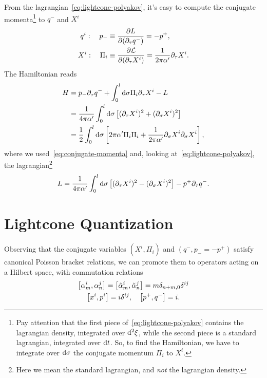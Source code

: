 From the lagrangian~\eqref{eq:lightcone-polyakov}, it's easy to compute the conjugate momenta\footnote{Pay attention that the first piece of~\eqref{eq:lightcone-polyakov} contains the lagrangian density, integrated over $\mathop{}\!\mathrm{d}^2 \xi$, while the second piece is a standard lagrangian, integrated over $\mathop{}\!\mathrm{d} t$. So, to find the Hamiltonian, we have to integrate over $\mathop{}\!\mathrm{d} \sigma$ the conjugate momentum $\Pi_i$ to $X^i$.} to $q^-$ and $X^i$
\begin{subequations}\label{eq:conjugate-momenta}
\begin{align}
    q^i: \quad p_- &\equiv \frac{\partial L}{\partial(\partial_\tau q^-)} = - p^+, \\
    X^i: \quad \Pi_i &\equiv \frac{\partial \mathcal{L}}{\partial(\partial_\tau X^i)} = \frac{1}{2\pi\alpha'} \partial_\tau X^i .
\end{align}
\end{subequations}
The Hamiltonian reads
\begin{equation}\label{eq:lightcone-hamiltonian}
\begin{split}
    H &= p_- \partial_\tau q^- + \int_0^l \mathop{}\!\mathrm{d} \sigma \Pi_i \partial_\tau X^i - L \\
    &= \frac{1}{4\pi\alpha'} \int_0^l \mathop{}\!\mathrm{d} \sigma \left[ (\partial_\tau X^i)^2 + (\partial_\sigma X^i)^2 \right] \\ 
    &= \frac{1}{2} \int_0^l \mathop{}\!\mathrm{d} \sigma \left[ 2\pi\alpha' \Pi_i \Pi_i + \frac{1}{2\pi\alpha'} \partial_\sigma X^i \partial_\sigma X^i \right],
\end{split}
\end{equation}
where we used~\eqref{eq:conjugate-momenta} and, looking at~\eqref{eq:lightcone-polyakov}, the lagrangian\footnote{Here we mean the standard lagrangian, and \emph{not} the lagrangian density.}
\begin{equation}
    L = \frac{1}{4\pi\alpha'} \int_0^l \mathop{}\!\mathrm{d} \sigma \left[ (\partial_\tau X^i)^2 - (\partial_\sigma X^i)^2 \right] - p^+ \partial_\tau q^- .
\end{equation}


\section{Lightcone Quantization}
Observing that the conjugate variables $(X^i, \Pi_i)$ and $(q^-,p_- = - p^+)$ satisfy canonical Poisson bracket relations, we can promote them to operators acting on a Hilbert space, with commutation relations
\begin{gather}
    \comm{\alpha^i_m}{\alpha^j_n} = \comm{\tilde{\alpha}^i_m}{\tilde{\alpha}^j_n} = m \delta_{n+m,0} \delta^{ij} \\
    \comm{x^i}{p^i} = i \delta^{ij}, \quad \comm{p^+}{q^-} = i .
\end{gather}

